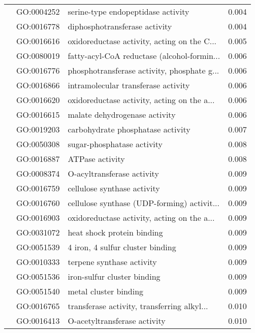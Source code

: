 \begin{longtable}{lllr}
   & GO:0004252 &           serine-type endopeptidase activity &         0.004 \\
   & GO:0016778 &                diphosphotransferase activity &         0.004 \\
   & GO:0016616 &  oxidoreductase activity, acting on the C... &         0.005 \\
   & GO:0080019 &  fatty-acyl-CoA reductase (alcohol-formin... &         0.006 \\
   & GO:0016776 &  phosphotransferase activity, phosphate g... &         0.006 \\
   & GO:0016866 &          intramolecular transferase activity &         0.006 \\
   & GO:0016620 &  oxidoreductase activity, acting on the a... &         0.006 \\
   & GO:0016615 &                malate dehydrogenase activity &         0.006 \\
   & GO:0019203 &            carbohydrate phosphatase activity &         0.007 \\
   & GO:0050308 &                   sugar-phosphatase activity &         0.008 \\
   & GO:0016887 &                              ATPase activity &         0.008 \\
   & GO:0008374 &                   O-acyltransferase activity &         0.009 \\
   & GO:0016759 &                  cellulose synthase activity &         0.009 \\
   & GO:0016760 &  cellulose synthase (UDP-forming) activit... &         0.009 \\
   & GO:0016903 &  oxidoreductase activity, acting on the a... &         0.009 \\
   & GO:0031072 &                   heat shock protein binding &         0.009 \\
   & GO:0051539 &             4 iron, 4 sulfur cluster binding &         0.009 \\
   & GO:0010333 &                    terpene synthase activity &         0.009 \\
   & GO:0051536 &                  iron-sulfur cluster binding &         0.009 \\
   & GO:0051540 &                        metal cluster binding &         0.009 \\
   & GO:0016765 &  transferase activity, transferring alkyl... &         0.010 \\
   & GO:0016413 &                 O-acetyltransferase activity &         0.010 \\

\end{longtable}
